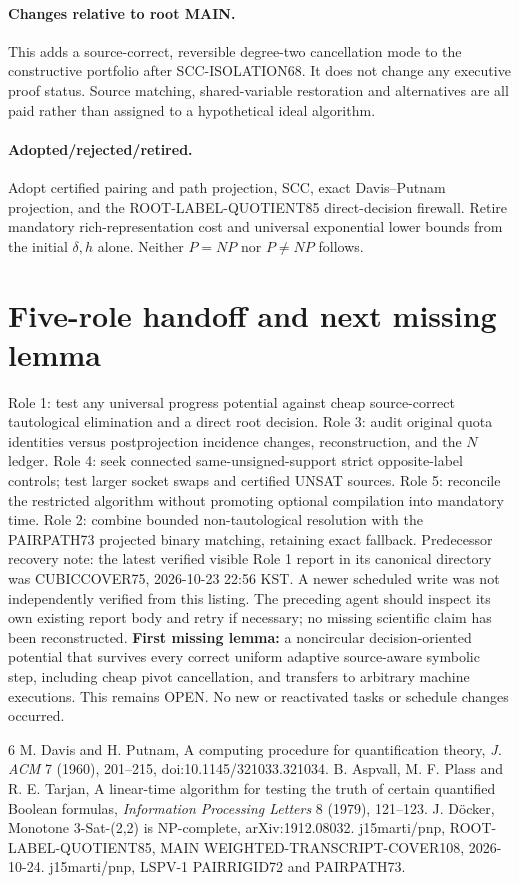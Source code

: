 \documentclass[11pt]{article}
\begin{document}
\paragraph{Changes relative to root MAIN.}
This adds a source-correct, reversible degree-two cancellation mode to the constructive portfolio after SCC-ISOLATION68. It does not change any executive proof status. Source matching, shared-variable restoration and alternatives are all paid rather than assigned to a hypothetical ideal algorithm.
\paragraph{Adopted/rejected/retired.}
Adopt certified pairing and path projection, SCC, exact Davis--Putnam projection, and the ROOT-LABEL-QUOTIENT85 direct-decision firewall. Retire mandatory rich-representation cost and universal exponential lower bounds from the initial $\delta,h$ alone. Neither $P=NP$ nor $P\ne NP$ follows.

\section{Five-role handoff and next missing lemma}
Role 1: test any universal progress potential against cheap source-correct tautological elimination and a direct root decision. Role 3: audit original quota identities versus postprojection incidence changes, reconstruction, and the $N$ ledger. Role 4: seek connected same-unsigned-support strict opposite-label controls; test larger socket swaps and certified UNSAT sources. Role 5: reconcile the restricted algorithm without promoting optional compilation into mandatory time. Role 2: combine bounded non-tautological resolution with the PAIRPATH73 projected binary matching, retaining exact fallback.
Predecessor recovery note: the latest verified visible Role 1 report in its canonical directory was CUBICCOVER75, 2026-10-23 22:56 KST. A newer scheduled write was not independently verified from this listing. The preceding agent should inspect its own existing report body and retry if necessary; no missing scientific claim has been reconstructed.
\textbf{First missing lemma:} a noncircular decision-oriented potential that survives every correct uniform adaptive source-aware symbolic step, including cheap pivot cancellation, and transfers to arbitrary machine executions. This remains OPEN. No new or reactivated tasks or schedule changes occurred.

\begin{thebibliography}{6}
 M. Davis and H. Putnam, A computing procedure for quantification theory, \emph{J. ACM} 7 (1960), 201--215, doi:10.1145/321033.321034.
 B. Aspvall, M. F. Plass and R. E. Tarjan, A linear-time algorithm for testing the truth of certain quantified Boolean formulas, \emph{Information Processing Letters} 8 (1979), 121--123.
 J. D\"ocker, Monotone 3-Sat-(2,2) is NP-complete, arXiv:1912.08032.
 j15marti/pnp, ROOT-LABEL-QUOTIENT85, MAIN WEIGHTED-TRANSCRIPT-COVER108, 2026-10-24.
 j15marti/pnp, LSPV-1 PAIRRIGID72 and PAIRPATH73.
\end{thebibliography}
\end{document}
